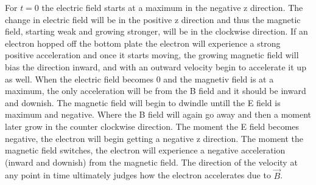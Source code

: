 \documentclass[a4paper,12pt]{article}
\newcommand{\V}[1]{\ensuremath{\vec{#1}}}
\begin{document}
For $t=0$ the electric field starts at a maximum in the negative z direction.  The change in electric field will be in the positive z direction and thus the magnetic field, starting weak and growing stronger, will be in the clockwise direction.  If an electron hopped off the bottom plate the electron will experience a strong positive acceleration and once it starts moving, the growing magnetic field will bias the direction inward, and with an outward velocity begin to accelerate it up as well.  When the electric field becomes 0 and the magnetiv field is at a maximum, the only acceleration will be  from the B field and it should be inward and downish.  The magnetic field will begin to dwindle untill the E field is maximum and negative.  Where the B field will again go away and then a moment later grow in the counter clockwise direction.  The moment the E field becomes negative, the electron will begin getting a negative z direction.  The moment the magnetic field switches, the electron will experience a negative acceleration (inward and downish) from the magnetic field.  The direction of the velocity at any point in time ultimately judges how the electron accelerates due to $\V{B}$.
\end{document}
